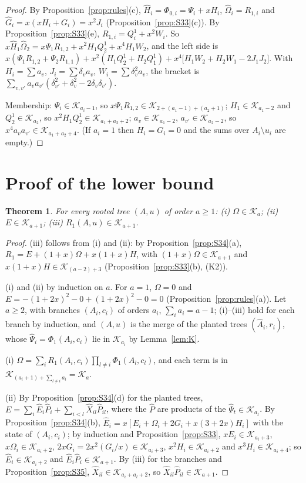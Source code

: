 \documentclass[11pt]{amsart}
\newtheorem{theorem}{Theorem}[section]
\theoremstyle{definition}
\theoremstyle{remark}
\newcommand{\K}{\mathcal K}
\begin{document}
\begin{proof}
By Proposition~\ref{prop:rules}(c), $\hat H_i=\Phi_{0,i}=\Psi_i+xH_i$,
$\hat\Omega_i=R_{1,i}$ and $\hat G_i=x(xH_i+G_i)=x^2J_i$
(Proposition~\ref{prop:S33}(c)). By Proposition~\ref{prop:S33}(e),
$R_{1,i}=Q^1_i+x^2W_i$. So $x\hat H_1\hat\Omega_2=x\Psi_1R_{1,2}+x^2H_1Q^1_2+x^4H_1W_2$,
and the left side is
$x(\Psi_1R_{1,2}+\Psi_2R_{1,1})+x^2(H_1Q^1_2+H_2Q^1_1)+x^4\bigl[H_1W_2+H_2W_1-2J_1J_2\bigr]$.
With $H_i=\sum a_v$, $J_i=\sum\delta_va_v$, $W_i=\sum\delta_v^2a_v$, the bracket is
$\sum_{v,v'}a_va_{v'}(\delta_{v'}^2+\delta_v^2-2\delta_v\delta_{v'})$.

Membership: $\Psi_i\in\K_{a_i-1}$, so $x\Psi_1R_{1,2}\in\K_{2+(a_1-1)+(a_2+1)}$;
$H_1\in\K_{a_1-2}$ and $Q^1_2\in\K_{a_2}$, so $x^2H_1Q^1_2\in\K_{a_1+a_2+2}$;
$a_v\in\K_{a_1-2}$, $a_{v'}\in\K_{a_2-2}$, so
$x^4a_va_{v'}\in\K_{a_1+a_2+4}$. (If $a_i=1$ then $H_i=G_i=0$ and the sums
over $A_i\setminus u_i$ are empty.)
\end{proof}

\section{Proof of the lower bound}\label{sec:lowerproof}

\begin{theorem}\label{thm:T5}
For every rooted tree $(A,u)$ of order $a\ge1$:
\textup{(i)} $\Omega\in\K_a$; \textup{(ii)} $E\in\K_{a+1}$;
\textup{(iii)} $R_1(A,u)\in\K_{a+1}$.
\end{theorem}

\begin{proof}
(iii) follows from (i) and (ii): by Proposition~\ref{prop:S34}(a),
$R_1=E+(1+x)\Omega+x(1+x)H$, with $(1+x)\Omega\in\K_{a+1}$ and
$x(1+x)H\in\K_{(a-2)+3}$ (Proposition~\ref{prop:S33}(b), (K2)).

(i) and (ii) by induction on $a$. For $a=1$, $\Omega=0$ and
$E=-(1+2x)^2-0+(1+2x)^2-0=0$ (Proposition~\ref{prop:rules}(a)). Let $a\ge2$,
with branches $(A_i,c_i)$ of orders $a_i$, $\sum_ia_i=a-1$; (i)--(iii) hold for
each branch by induction, and $(A,u)$ is the merge of the planted trees
$(\hat A_i,r_i)$, whose $\hat\Psi_i=\Phi_1(A_i,c_i)$ lie in $\K_{a_i}$ by
Lemma~\ref{lem:K}.

(i) $\Omega=\sum_iR_1(A_i,c_i)\prod_{l\ne i}\Phi_1(A_l,c_l)$, and each term is
in $\K_{(a_i+1)+\sum_{l\ne i}a_l}=\K_a$.

(ii) By Proposition~\ref{prop:S34}(d) for the planted trees,
$E=\sum_i\hat E_i\hat P_i+\sum_{i<l}\hat X_{il}\hat P_{il}$, where the $\hat P$
are products of the $\hat\Psi_t\in\K_{a_t}$. By Proposition~\ref{prop:S34}(b),
$\hat E_i=x[E_i+\Omega_i+2G_i+x(3+2x)H_i]$ with the state of $(A_i,c_i)$; by
induction and Proposition~\ref{prop:S33}, $xE_i\in\K_{a_i+3}$,
$x\Omega_i\in\K_{a_i+2}$, $2xG_i=2x^2(G_i/x)\in\K_{a_i+3}$, $x^2H_i\in\K_{a_i+2}$
and $x^3H_i\in\K_{a_i+4}$; so $\hat E_i\in\K_{a_i+2}$ and
$\hat E_i\hat P_i\in\K_{a+1}$. By (iii) for the branches and
Proposition~\ref{prop:S35}, $\hat X_{il}\in\K_{a_i+a_l+2}$, so
$\hat X_{il}\hat P_{il}\in\K_{a+1}$.
\end{proof}
\end{document}
